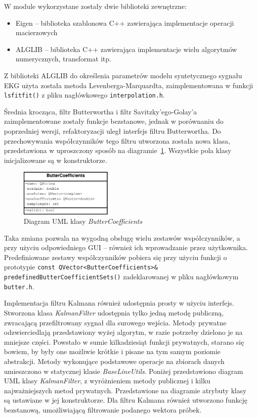 W module wykorzystane zostały dwie biblioteki zewnętrzne:

\begin{itemize}
\item Eigen -- biblioteka szablonowa C++ zawierająca implementacje operacji macierzowych
\item ALGLIB -- biblioteka C++ zawierająca implementacje wielu algorytmów numerycznych, transformat itp. 
\end{itemize}

Z biblioteki ALGLIB do określenia parametrów modelu syntetycznego sygnału EKG użyta została metoda Levenberga-Marquardta, zaimplementowana w funkcji \texttt{lsfitfit()} z pliku nagłówkowego \texttt{interpolation.h}. 

Średnia krocząca, filtr Butterwortha i filtr Savitzky'ego-Golay'a zaimplementowane zostały funkcje bezstanowe, jednak w porównaniu do poprzedniej wersji, refaktoryzacji uległ interfejs filtru Butterwortha. Do przechowywania współczynników tego filtru utworzona została nowa klasa, przedstawiona w uproszczony sposób na diagramie~\ref{fig:ButterCoefficients_uml}. Wszystkie pola klasy inicjalizowane są w konstruktorze.

\begin{figure}[H]
\centering
	\includegraphics[width=0.4\textwidth]{ECG_BASELINE/figures/ButterCoefficients.eps}
\caption{Diagram UML klasy \textit{ButterCoefficients}}
\label{fig:ButterCoefficients_uml}
\end{figure}

Taka zmiana pozwala na wygodną obsługę wielu zestawów współczynników, a przy użyciu odpowiedniego GUI -- również ich wprowadzanie przez użytkownika. Predefiniowane zestawy współczynników pobiera się przy użyciu funkcji o prototypie \texttt{const QVector<ButterCoefficients>\& predefinedButterCoefficientSets()} zadeklarowanej w pliku nagłówkowym \texttt{butter.h}.

Implementacja filtru Kalmana również udostępnia prosty w użyciu interfejs. Stworzona klasa \textit{KalmanFilter} udostępnia tylko jedną metodę publiczną, zwracającą przefiltrowany sygnał dla surowego wejścia. Metody prywatne odzwierciedlają przedstawiony wyżej algorytm, w razie potrzeby dzielono je na mniejsze części. Powstało w sumie kilkadziesiąt funkcji prywatnych, starano się bowiem, by były one możliwie krótkie i pisane na tym samym poziomie abstrakcji. Metody wykonujące podstawowe operacje na zbiorach danych umieszczono w statycznej klasie \textit{BaseLineUtils}. Poniżej przedstawiono diagram UML klasy \textit{KalmanFilter}, z wyróżnieniem metody publicznej i kilku najważniejszych metod prywatnych. Przedstawione na diagramie atrybuty klasy są ustawiane w jej konstruktorze. Dla filtru Kalmana również utworzono funkcję bezstanową, umożliwiającą filtrowanie podanego wektora próbek.

